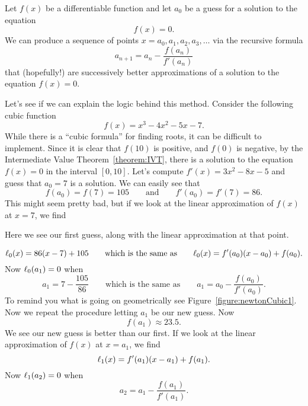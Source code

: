 \begin{newtonsMethod}
Let $f(x)$ be a differentiable function and let $a_0$ be a
guess for a solution to the equation
\[
f(x) = 0.
\]
We can produce a sequence of points $x=a_0, a_1, a_2, a_3, \dots$ via
the recursive formula
\[
a_{n+1} = a_n -\frac{f(a_n)}{f'(a_n)}
\]
that (hopefully!) are successively better approximations of a solution
to the equation $f(x) = 0$.
\end{newtonsMethod}
Let's see if we can explain the logic behind this method. Consider the
following cubic function
\[
f(x) = x^3 - 4 x^2 - 5 x - 7.
\]
While there is a ``cubic formula'' for finding roots, it can be
difficult to implement. Since it is clear that $f(10)$ is positive,
and $f(0)$ is negative, by the Intermediate Value
Theorem~\ref{theorem:IVT}, there is a solution to the equation $f(x) =
0$ in the interval $[0,10]$. Let's compute $f'(x) = 3x^2 -8x-5$ and
guess that $a_0=7$ is a solution. We can easily see that
\[
f(a_0) = f(7) = 105\qquad\text{and}\qquad f'(a_0) = f'(7) = 86.
\]
This might seem pretty bad, but if we look at the linear approximation
of $f(x)$ at $x=7$, we find
\begin{marginfigure}[-1in]
\caption{Here we see our first guess, along with the linear
  approximation at that point.}
\label{figure:newtonCubic1}
\end{marginfigure}
\[
\ell_0(x) = 86(x-7) + 105 \qquad\text{which is the same as}\qquad \ell_0(x) = f'(a_0)(x-a_0) + f(a_0).
\]
Now $\ell_0(a_1) = 0$ when
\[
a_1 = 7 - \frac{105}{86} \qquad\text{which is the same as}\qquad a_1 = a_0
-\frac{f(a_0)}{f'(a_0)}.
\]
To remind you what is going on geometrically see
Figure~\ref{figure:newtonCubic1}. Now we repeat the procedure letting
$a_1$ be our new guess. Now
\[
f(a_1) \approx 23.5.
\]
We see our new guess is better than our first. If we look at the
linear approximation of $f(x)$ at $x=a_1$, we find
\[
\ell_1(x) = f'(a_1)(x-a_1) + f(a_1).
\]
Now $\ell_1(a_2) = 0$ when
\[
a_2 = a_1 - \frac{f(a_1)}{f'(a_1)}.
\]

